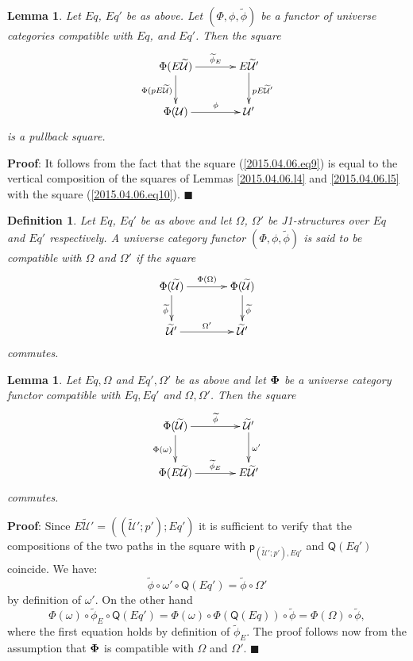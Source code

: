 \documentclass[12pt]{article}
\numberwithin{equation}{section}
\newenvironment{eq}{\begin{equation}}{\end{equation}}
\newenvironment{myproof}{{\bf Proof}:}{$\blacksquare$ \vskip 5mm }
\newtheorem{lemma}[proposition]{Lemma}
\newtheorem{definition}[proposition]{Definition}
\newcommand{\wt}{\widetilde}
\newcommand{\p}{\mathsf{p}}
\newcommand{\U}{\mathcal{U}}
\newcommand{\Q}{\mathsf{Q}}
\begin{document}
%
\begin{lemma}
\label{2015.04.06.l6} Let $Eq$, $Eq'$ be as above. Let $(\Phi,\phi,\wt{\phi})$
be a functor of universe categories compatible with $Eq$, and $Eq'$. Then the
square
%
\begin{eq}\label{2015.04.06.eq9}
\begin{xy}
          \xymatrix@C=3pc{ \Phi(E\wt{\U}) \ar[r]^-{\wt{\phi}_{E}}
            \ar[d]_{\Phi(pE\wt{\U})} & E\wt{\U}' \ar[d]^{pE\wt{\U}'}\\ \Phi(\U)
            \ar[r]^-{\phi} & \U' }
\end{xy}
\end{eq}%
%
is a pullback square.
%
\end{lemma} 
%
\begin{myproof}
It follows from the fact that the square (\ref{2015.04.06.eq9}) is equal to the
vertical composition of the squares of Lemmas \ref{2015.04.06.l4} and
\ref{2015.04.06.l5} with the square (\ref{2015.04.06.eq10}).
\end{myproof}
%


\begin{definition}
\label{2015.04.06.def5} Let $Eq$, $Eq'$ be as above and let $\Omega$,
$\Omega'$ be J1-structures over $Eq$ and $Eq'$ respectively. A universe
category functor $(\Phi,\phi,\wt{\phi})$ is said to be compatible with $\Omega$
and $\Omega'$ if the square
%
$$
\begin{xy}
          \xymatrix@C=3pc{ \Phi(\wt{\U}) \ar[r]^-{\Phi(\Omega)}
            \ar[d]_{\wt{\phi}} & \Phi(\wt{\U})\ar[d]^{\wt{\phi}}\\ \wt{\U}'
            \ar[r]^-{\Omega'} & \wt{\U}' }
\end{xy}
$$
%
commutes.
\end{definition}
%
\begin{lemma}
\label{2015.04.10.l7} Let $Eq,\Omega$ and $Eq',\Omega'$ be as above and let
${\bf\Phi}$ be a universe category functor compatible with $Eq,Eq'$ and
$\Omega,\Omega'$. Then the square
%
$$
\begin{xy}
          \xymatrix@C=3pc{ \Phi(\wt{\U}) \ar[r]^-{\wt{\phi}}
            \ar[d]_{\Phi(\omega)} & \wt{\U}'\ar[d]^-{\omega'}\\ \Phi(E\wt{\U})
            \ar[r]^-{\wt{\phi}_{E}} & E\wt{\U}' }
\end{xy}
$$
%
commutes.
\end{lemma}
%
\begin{myproof}
Since $E\wt{\U}'=((\wt{\U}';p');Eq')$ it is sufficient to verify that the
compositions of the two paths in the square with $\p_{(\wt{\U}';p'),Eq'}$ and
$\Q(Eq')$ coincide. We have:
%
$$\wt{\phi}\circ\omega'\circ \Q(Eq')=\wt{\phi}\circ\Omega'$$
%
by definition of $\omega'$. On the other hand
%
$$\Phi(\omega)\circ \wt{\phi}_{E}\circ \Q(Eq')=\Phi(\omega)\circ
\Phi(\Q(Eq))\circ \wt{\phi}=\Phi(\Omega)\circ\wt{\phi},$$
%
where the first equation holds by definition of $\wt{\phi}_{E}$. The proof
follows now from the assumption that ${\bf\Phi}$ is compatible with $\Omega$
and $\Omega'$.
\end{myproof}
%
\end{document}
